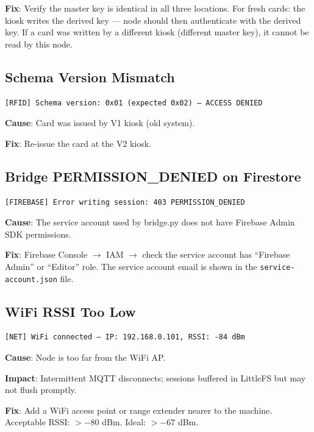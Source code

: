 \textbf{Fix}: Verify the master key is identical in all three locations. For fresh cards: the kiosk writes the derived key --- node should then authenticate with the derived key. If a card was written by a different kiosk (different master key), it cannot be read by this node.

\subsection{Schema Version Mismatch}

\begin{verbatim}
[RFID] Schema version: 0x01 (expected 0x02) — ACCESS DENIED
\end{verbatim}

\textbf{Cause}: Card was issued by V1 kiosk (old system).

\textbf{Fix}: Re-issue the card at the V2 kiosk.

\subsection{Bridge PERMISSION\_DENIED on Firestore}

\begin{verbatim}
[FIREBASE] Error writing session: 403 PERMISSION_DENIED
\end{verbatim}

\textbf{Cause}: The service account used by bridge.py does not have Firebase Admin SDK permissions.

\textbf{Fix}: Firebase Console $\rightarrow$ IAM $\rightarrow$ check the service account has ``Firebase Admin'' or ``Editor'' role. The service account email is shown in the \texttt{service-account.json} file.

\subsection{WiFi RSSI Too Low}

\begin{verbatim}
[NET] WiFi connected — IP: 192.168.0.101, RSSI: -84 dBm
\end{verbatim}

\textbf{Cause}: Node is too far from the WiFi AP.

\textbf{Impact}: Intermittent MQTT disconnects; sessions buffered in LittleFS but may not flush promptly.

\textbf{Fix}: Add a WiFi access point or range extender nearer to the machine. Acceptable RSSI: $>-80$ dBm. Ideal: $>-67$ dBm.

